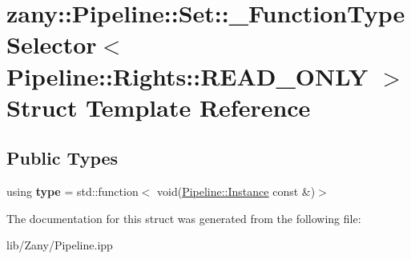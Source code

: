 \hypertarget{structzany_1_1_pipeline_1_1_set_1_1___function_type_selector_3_01_pipeline_1_1_rights_1_1_r_e_a_d___o_n_l_y_01_4}{}\section{zany\+:\+:Pipeline\+:\+:Set\+:\+:\+\_\+\+Function\+Type\+Selector$<$ Pipeline\+:\+:Rights\+:\+:R\+E\+A\+D\+\_\+\+O\+N\+LY $>$ Struct Template Reference}
\label{structzany_1_1_pipeline_1_1_set_1_1___function_type_selector_3_01_pipeline_1_1_rights_1_1_r_e_a_d___o_n_l_y_01_4}
\subsection*{Public Types}
\begin{DoxyCompactItemize}
\item 
\mbox{\label{structzany_1_1_pipeline_1_1_set_1_1___function_type_selector_3_01_pipeline_1_1_rights_1_1_r_e_a_d___o_n_l_y_01_4_abfa955245dbf3ef822331db11e11d147}} 
using {\bfseries type} = std\+::function$<$ void(\hyperlink{classzany_1_1_pipeline_1_1_instance}{Pipeline\+::\+Instance} const \&)$>$
\end{DoxyCompactItemize}


The documentation for this struct was generated from the following file\+:\begin{DoxyCompactItemize}
\item 
lib/\+Zany/Pipeline.\+ipp\end{DoxyCompactItemize}
